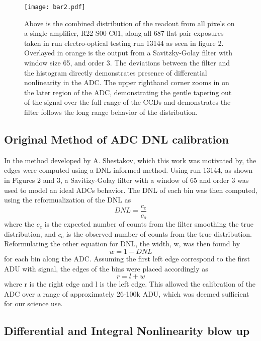 \documentclass[11pt, letterpaper]{article}
\begin{document}
\begin{figure}
	\texttt{[image: bar2.pdf]}
	\caption{Above is the combined distribution of the readout from all pixels on a single amplifier, R22 S00 C01, along all 687 flat pair exposures taken in run electro-optical testing run 13144 as seen in figure 2. Overlayed in orange is the output from a Savitzky-Golay filter with window size 65, and order 3. The deviations between the filter and the histogram directly demonstrates presence of differential nonlinearity in the ADC. The upper righthand corner zooms in on the later region of the ADC, demonstrating the gentle tapering out of the signal over the full range of the CCDs and demonstrates the filter follows the long range behavior of the distribution.}
\end{figure}


\subsection{Original Method of ADC DNL calibration}
\indent


In the method developed by A. Shestakov, which this work was motivated by, the edges were computed using a DNL informed method. 
Using run 13144, as shown in Figures 2 and 3, a Savitizy-Golay filter with a window of 65 and order 3 was used to model an ideal ADCs behavior. 
The DNL of each bin was then computed, using the reformualization of the DNL as 
 \[ DNL = \frac{c_e}{c_o}\]
where the $c_{e}$ is the expected number of counts from the filter smoothing the true distribution, and $c_{o}$ is the observed number of counts from the true distribution. 
Reformulating the other equation for DNL, the width, w, was then found by
 \[ w = 1-DNL\]
for each bin along the ADC. 
Assuming the first left edge correspond to the first ADU with signal, the edges of the bins were placed accordingly as
\[ r = l + w \]
where r is the right edge and l is the left edge. 
This allowed the calibration of the ADC over a range of approximately 26-100k ADU, which was deemed sufficient for our science use. 


\subsection{Differential and Integral Nonlinearity blow up}
\indent
\end{document}
